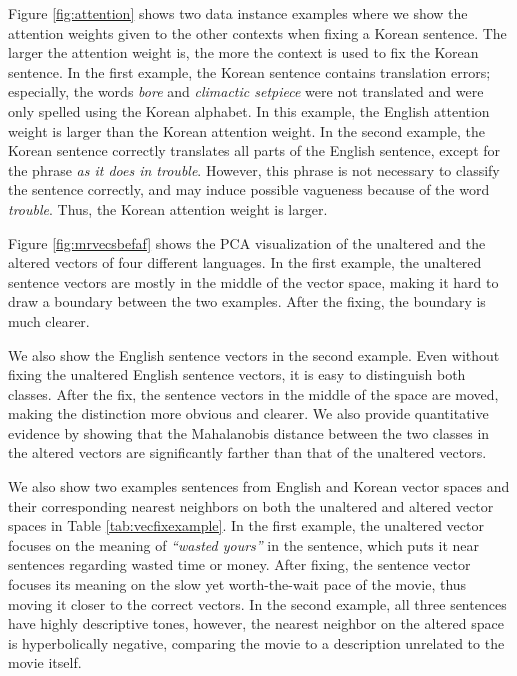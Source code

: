 \documentclass{article}
\begin{document}
Figure \ref{fig:attention} shows two data instance examples where we show the attention weights given to the other contexts when fixing a Korean sentence. The larger the attention weight is, the more the context is used to fix the Korean sentence. In the first example, the Korean sentence contains translation errors; especially, the words \textit{bore} and \textit{climactic setpiece} were not translated and were only spelled using the Korean alphabet. In this example, the English attention weight is larger than the Korean attention weight. In the second example, the Korean sentence correctly translates all parts of the English sentence, except for the phrase \textit{as it does in trouble}. However, this phrase is not necessary to classify the sentence correctly, and may induce possible vagueness because of the word \textit{trouble}. Thus, the Korean attention weight is larger.



Figure \ref{fig:mrvecsbefaf} shows the PCA visualization of the unaltered and the altered vectors of four different languages. In the first 
example, the unaltered 
sentence vectors are mostly in the middle of the vector space, making it hard to draw a boundary between
the two
examples. After the fixing, the boundary is much clearer.
\begin{comment}
In the second example, it is impossible to distinguish the classes as
the vectors 
are overlapping with each other. After the fix,
the blue-class and red-class vectors moved to the opposite sides,
making it easier to tell and differentiate the two classes. 
\end{comment}
We also show the English sentence vectors in the second example. Even without fixing the unaltered English sentence vectors, it is easy to distinguish both classes. After the fix, the sentence vectors in the middle of the space are moved,
making the distinction more obvious and clearer. We also provide quantitative evidence by showing that the Mahalanobis distance between the two classes in the altered vectors are significantly farther than that of the unaltered vectors.

We also show two examples sentences from English and Korean vector spaces and their corresponding nearest neighbors on both the unaltered and altered vector spaces in Table \ref{tab:vecfixexample}. In the first example, the unaltered vector focuses on the meaning of \textit{``wasted yours''} in the sentence, which puts it near sentences regarding wasted time or money. After fixing, the sentence vector focuses its meaning on the slow yet worth-the-wait pace of the movie, thus moving it closer to the correct vectors. In the second example, all three sentences have highly descriptive tones, however, the nearest neighbor on the altered space is hyperbolically negative, comparing the movie to a description unrelated to the movie itself.
\end{document}
